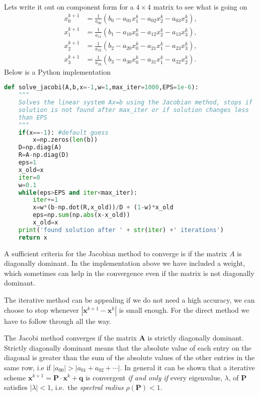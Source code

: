 \documentclass[graybox,sectrefs,envcountresetchap,open=right,final]{svmonodo}
\newenvironment{graybox2admon}[1][]{
\begin{graybox2mdframed}[frametitle=#1]
}
{
\end{graybox2mdframed}
}
\begin{document}
Lets write it out on component form for a $4\times4$ matrix to see what is going on
\begin{align}
x_0^{k+1} &=\frac{1}{a_{00}}(b_0-a_{01}x_1^k-a_{02}x_2^k-a_{03}x_3^k),
\label{eq:lin:jc3a}\\ 
x_1^{k+1} &=\frac{1}{a_{11}}(b_1-a_{10}x_0^k-a_{12}x_2^k-a_{13}x_3^k),
\label{eq:lin:jc3b}\\ 
x_2^{k+1} &=\frac{1}{a_{22}}(b_2-a_{20}x_0^k-a_{21}x_1^k-a_{23}x_3^k),
\label{eq:lin:jc3c}\\ 
x_3^{k+1} &=\frac{1}{a_{33}}(b_3-a_{30}x_0^k-a_{31}x_1^k-a_{32}x_2^k).
\label{eq:lin:jc3d}
\end{align}
Below is a Python implementation






















\begin{lstlisting}[language=python,style=blue1]
def solve_jacobi(A,b,x=-1,w=1,max_iter=1000,EPS=1e-6):
    """
    Solves the linear system Ax=b using the Jacobian method, stops if
    solution is not found after max_iter or if solution changes less 
    than EPS
    """
    if(x==-1): #default guess 
        x=np.zeros(len(b))
    D=np.diag(A)
    R=A-np.diag(D)
    eps=1
    x_old=x
    iter=0
    w=0.1
    while(eps>EPS and iter<max_iter):
        iter+=1
        x=w*(b-np.dot(R,x_old))/D + (1-w)*x_old
        eps=np.sum(np.abs(x-x_old))
        x_old=x
    print('found solution after ' + str(iter) +' iterations')
    return x

\end{lstlisting}

A sufficient criteria for the Jacobian method to converge is if the matrix $A$ is diagonally dominant. In the implementation above we have included a weight, which sometimes can help in the convergence even if the matrix is not diagonally dominant. 

The iterative method can be appealing if we do not need a high accuracy, we can choose to stop whenever $|\mathbf{x}^{k+1}-\mathbf{x}^k|$ is small enough. For the direct method we have to follow through all the way.


\begin{graybox2admon}[Convergence]
The Jacobi method converges if the matrix $\mathbf{A}$ is strictly diagonally dominant. Strictly diagonally dominant means that the absolute value of each entry on the diagonal is greater than the sum of the absolute values of the other entries in the same row, i.e if $|a_{00}|>|a_{01}+a_{02}+\cdots|$. In general it can be shown that a iterative scheme $\mathbf{x}^{k+1}=\mathbf{P}\cdot \mathbf{x}^k+\mathbf{q}$ is convergent \emph{if and only if} every eigenvalue, $\lambda$, of $\mathbf{P}$ satisfies $|\lambda|<1$, i.e.~the \emph{spectral radius} $\rho(\mathbf{P})<1$.
\end{graybox2admon}
\end{document}
